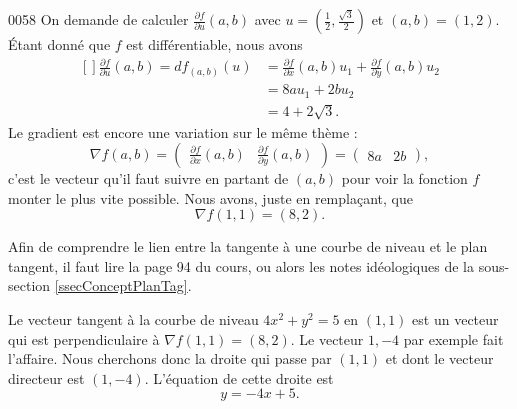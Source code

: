 \begin{corrige}{0058}
On demande de calculer $\frac{ \partial f }{ \partial u }(a,b)$ avec $u=(\frac{ 1 }{2},\frac{ \sqrt{3} }{2})$ et $(a,b)=(1,2)$. Étant donné que $f$ est différentiable, nous avons
\begin{equation}
	\begin{aligned}[]
	\frac{ \partial f }{ \partial u }(a,b)=df_{(a,b)}(u)&=\frac{ \partial f }{ \partial x }(a,b)u_1+\frac{ \partial f }{ \partial y }(a,b)u_2\\
			&=8au_1+2bu_2\\
			&=4+2\sqrt{3}.
	\end{aligned}
\end{equation}
Le gradient est encore une variation sur le même thème :
\begin{equation}
	\nabla f(a,b)=\begin{pmatrix} 
	\frac{ \partial f }{ \partial x }(a,b)	&	\frac{ \partial f }{ \partial y }(a,b)	
\end{pmatrix}=\begin{pmatrix} 
	8a	&	2b	
\end{pmatrix},
\end{equation}
c'est le vecteur qu'il faut suivre en partant de $(a,b)$ pour voir la fonction $f$ monter le plus vite possible. Nous avons, juste en remplaçant, que
\begin{equation}
	\nabla f(1,1)=(8,2).
\end{equation}

Afin de comprendre le lien entre la tangente à une courbe de niveau et le plan tangent, il faut lire la page 94 du cours, ou alors les notes idéologiques de la sous-section \ref{ssecConceptPlanTag}. 

Le vecteur tangent à la courbe de niveau $4x^2+y^2=5$ en $(1,1)$ est un vecteur qui est perpendiculaire à $\nabla f(1,1)=(8,2)$. Le vecteur $1,-4$ par exemple fait l'affaire. Nous cherchons donc la droite qui passe par $(1,1)$ et dont le vecteur directeur est $(1,-4)$. L'équation de cette droite est
\begin{equation}
	y=-4x+5.
\end{equation}


\end{corrige}
